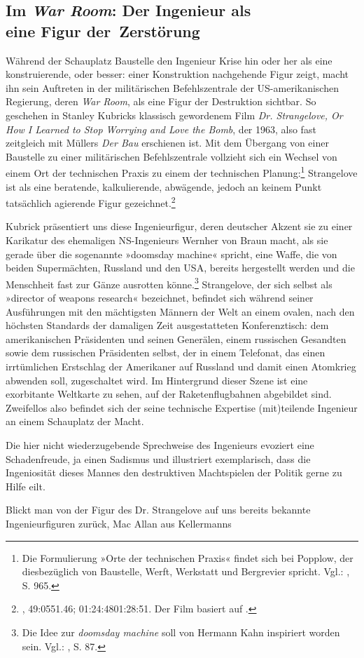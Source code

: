 \documentclass[%
	fontsize=10pt,%
	twoside,%
	headings=optiontoheadandtoc,%
	showtrims]{scrbook}
\begin{document}
\subsection[Im \emph{War Room}: Der Ingenieur als    eine Figur der~Zerstörung]{Im \emph{War Room}: Der Ingenieur als \- \protect\\ eine Figur der~Zerstörung}
\par Während der Schauplatz Baustelle den Ingenieur \textendash{} Krise hin oder her \textendash{} als eine konstruierende, oder besser: einer Konstruktion nachgehende Figur zeigt, macht ihn sein Auftreten in der militärischen Befehlszentrale der US-amerikanischen Regierung, deren \emph{War Room}, als eine Figur der Destruktion sichtbar. So geschehen in Stanley Kubricks klassisch gewordenem Film \emph{Dr. Strangelove, Or How I Learned to Stop Worrying and Love the Bomb}, der 1963, also fast zeitgleich mit Müllers \emph{Der Bau} erschienen ist. Mit dem Übergang von einer Baustelle zu einer militärischen Befehlszentrale vollzieht sich ein Wechsel von einem Ort der technischen Praxis zu einem der technischen Planung:\footnote{Die Formulierung »Orte der technischen Praxis« findet sich bei Popplow, der diesbezüglich von Baustelle, Werft, Werkstatt und Bergrevier spricht. Vgl.: \cite[][]{popplow2007a}, S. 965.}  Strangelove ist als eine beratende, kalkulierende, abwägende, jedoch an keinem Punkt tatsächlich agierende Figur gezeichnet.\footnote{\cite[][]{kubrick1963a}, 49:05\textendash{}51.46; 01:24:48\textendash{}01:28:51. Der Film basiert auf \cite[][]{bryant1958a}.} \par Kubrick präsentiert uns diese Ingenieurfigur, deren deutscher Akzent sie zu einer Karikatur des ehemaligen NS-Ingenieurs Wernher von Braun macht, als sie gerade über die sogenannte »doomsday machine« spricht, eine Waffe, die von beiden Supermächten, Russland und den USA, bereits hergestellt werden und die Menschheit fast zur Gänze ausrotten könne.\footnote{Die Idee zur \emph{doomsday machine} soll von Hermann Kahn inspiriert worden sein. Vgl.: \cite[][]{erickson2013a}, S. 87.}  Strangelove, der sich selbst als »director of weapons research« bezeichnet, befindet sich während seiner Ausführungen mit den mächtigsten Männern der Welt an einem ovalen, nach den höchsten Standards der damaligen Zeit ausgestatteten Konferenztisch: dem amerikanischen Präsidenten und seinen Generälen, einem russischen Gesandten sowie dem russischen Präsidenten selbst, der in einem Telefonat, das einen irrtümlichen Erstschlag der Amerikaner auf Russland und damit einen Atomkrieg abwenden soll, zugeschaltet wird. Im Hintergrund dieser Szene ist eine exorbitante Weltkarte zu sehen, auf der Raketenflugbahnen abgebildet sind. Zweifellos also befindet sich der seine technische Expertise (mit)teilende Ingenieur an einem Schauplatz der Macht.\par Die hier nicht wiederzugebende Sprechweise des Ingenieurs evoziert eine Schadenfreude, ja einen Sadismus und illustriert exemplarisch, dass die Ingeniosität dieses Mannes den destruktiven Machtspielen der Politik gerne zu Hilfe eilt.\par Blickt man von der Figur des Dr. Strangelove auf uns bereits bekannte Ingenieurfiguren zurück, Mac Allan aus Kellermanns 
\end{document}
